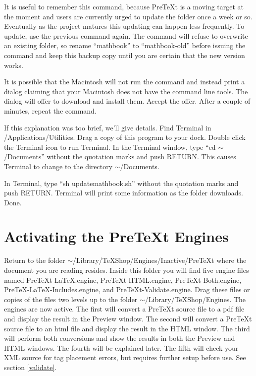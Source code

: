 \documentclass[11pt, oneside]{article}   	%
\begin{document}
\newpage
It is useful to remember this command, because PreTeXt is a moving target at the moment and users are currently urged to update the folder once a week or so. Eventually as the project matures this updating can happen less frequently. To update, use the previous command again. The command  will refuse to overwrite an existing folder, so rename ``mathbook'' to ``mathbook-old'' before issuing the command and keep this backup copy until you are certain that the new version works.

It is possible that the Macintosh will not run the command and instead print a dialog claiming that your Macintosh does not have the command line tools. The dialog will offer to download and install them. Accept the offer. After a couple of minutes, repeat the command.

If this explanation was too brief, we'll give details.
Find Terminal in /Applications/Utilities. Drag a copy of this program to your dock. Double click the Terminal  icon to run Terminal.   In the Terminal window, type  ``cd $\sim$/Documents'' without the quotation marks and push RETURN. This causes Terminal to change to the directory $\sim$/Documents.

In Terminal, type ``sh updatemathbook.sh'' without the quotation marks and push RETURN. Terminal will print some information as the folder downloads. Done.

\section{Activating the PreTeXt Engines}

Return to the folder $\sim$/Library/TeXShop/Engines/Inactive/PreTeXt where the document you are reading resides. Inside this folder you will find five engine files named PreTeXt-LaTeX.engine, PreTeXt-HTML.engine, PreTeXt-Both.engine, PreTeX-LaTeX-Includes.engine, and PreTeXt-Validate.engine.
Drag these files or copies of the files two levels up to the folder $\sim$/Library/TeXShop/Engines. The engines are now active. The first will convert a PreTeXt source file to a pdf file and display the result in the Preview window. The second will convert a PreTeXt source file to an html file and display the result in the HTML window. The third will perform both conversions and show the results in both the Preview and HTML windows. The fourth will be explained later. The fifth will check your XML source for tag placement errors, but requires further setup before use. See section \ref{validate}.
\end{document}
